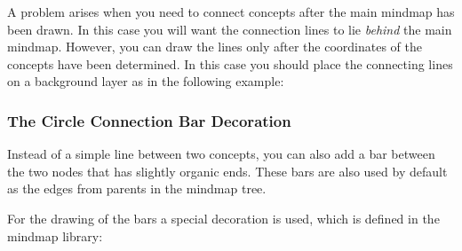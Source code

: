 A problem arises when you need to connect concepts after the main
mindmap has been drawn. In this case you will want the connection
lines to lie \emph{behind} the main mindmap. However, you can draw the
lines only after the coordinates of the concepts have been
determined. In this case you should place the connecting lines on a
background layer as in the following example:

\begin{codeexample}[]
\end{codeexample}


\subsubsection{The Circle Connection Bar Decoration}

Instead of a simple line between two concepts, you can also add a bar
between the two nodes that has slightly organic ends. These bars are
also used by default as the edges from parents in the mindmap tree.

For the drawing of the bars a special decoration is used, which is defined
in the mindmap library:

